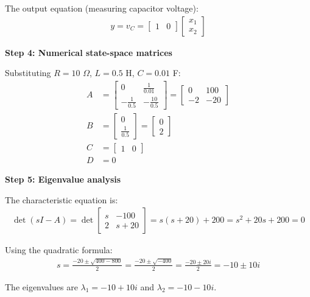 \documentclass[11pt,a4paper]{article}
\begin{document}
The output equation (measuring capacitor voltage):
\begin{align}
y = v_C = \begin{bmatrix} 1 & 0 \end{bmatrix}\begin{bmatrix} x_1 \\ x_2 \end{bmatrix}
\end{align}

\textbf{Step 4: Numerical state-space matrices}

Substituting $R = 10$ $\Omega$, $L = 0.5$ H, $C = 0.01$ F:
\begin{align}
A &= \begin{bmatrix} 0 & \frac{1}{0.01} \\ -\frac{1}{0.5} & -\frac{10}{0.5} \end{bmatrix} = \begin{bmatrix} 0 & 100 \\ -2 & -20 \end{bmatrix} \\
B &= \begin{bmatrix} 0 \\ \frac{1}{0.5} \end{bmatrix} = \begin{bmatrix} 0 \\ 2 \end{bmatrix} \\
C &= \begin{bmatrix} 1 & 0 \end{bmatrix} \\
D &= 0
\end{align}

\textbf{Step 5: Eigenvalue analysis}

The characteristic equation is:
\begin{align}
\det(sI - A) = \det\begin{bmatrix} s & -100 \\ 2 & s+20 \end{bmatrix} = s(s+20) + 200 = s^2 + 20s + 200 = 0
\end{align}

Using the quadratic formula:
\begin{align}
s = \frac{-20 \pm \sqrt{400 - 800}}{2} = \frac{-20 \pm \sqrt{-400}}{2} = \frac{-20 \pm 20i}{2} = -10 \pm 10i
\end{align}

The eigenvalues are $\lambda_1 = -10 + 10i$ and $\lambda_2 = -10 - 10i$.
\end{document}
